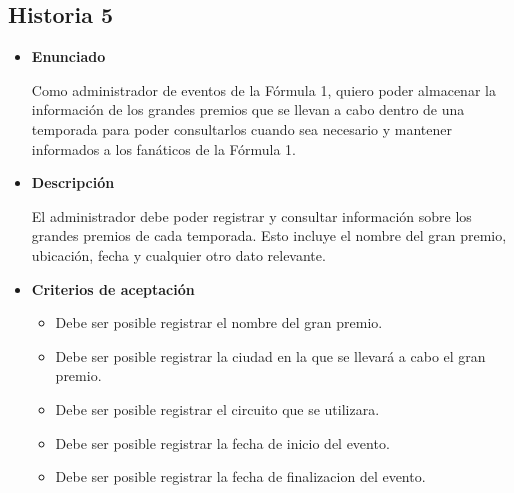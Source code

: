\documentclass{article}
\begin{document}
	\subsection{Historia 5}
	\begin{itemize}
		
		\item \large{\textbf{Enunciado}}
		\begin{description}
Como administrador de eventos de la Fórmula 1, quiero poder almacenar la información de los grandes premios que se llevan a cabo dentro de una temporada para poder consultarlos cuando sea necesario y mantener informados a los fanáticos de la Fórmula 1.
		\end{description}
		
		\item \large{\textbf{Descripción}}
		\begin{description}
El administrador debe poder registrar y consultar información sobre los grandes premios de cada temporada. Esto incluye el nombre del gran premio, ubicación, fecha y cualquier otro dato relevante. 

		\end{description}
		
		\item \large{\textbf{Criterios de aceptación}}
		\begin{itemize}
			\item Debe ser posible registrar el nombre del gran premio.
			\item Debe ser posible registrar la ciudad en la que se llevará a cabo  el gran premio. 
			\item Debe ser posible registrar el circuito que se utilizara. 
			\item Debe ser posible registrar la fecha de inicio del evento. 
			\item Debe ser posible registrar la fecha de finalizacion del evento.
			
		\end{itemize}
		
	\end{itemize}
	
\end{document}
